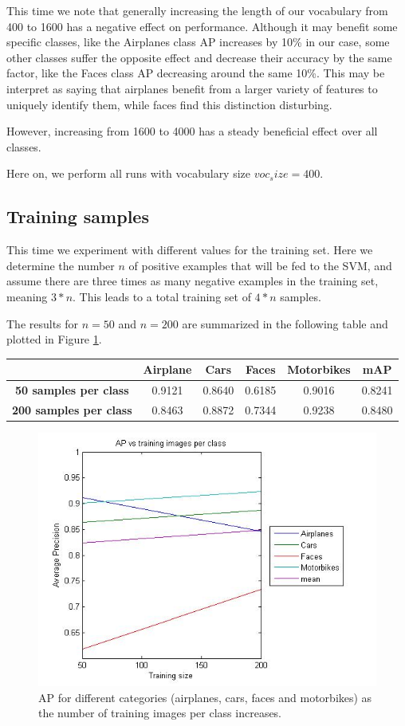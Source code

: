 \documentclass[11pt]{article}
\begin{document}
This time we note that generally increasing the length of our vocabulary from 400 to 1600 has a negative effect on performance. Although it may benefit some specific classes, like the Airplanes class AP increases by 10\% in our case, some other classes suffer the opposite effect and decrease their accuracy by the same factor, like the Faces class AP decreasing around the same 10\%. This may be interpret as saying that airplanes benefit from a larger variety of features to uniquely identify them, while faces find this distinction disturbing.

However, increasing from 1600 to 4000 has a steady beneficial effect over all classes.

Here on, we perform all runs with vocabulary size $voc_size = 400$.

\subsection{Training samples}
This time we experiment with different values for the training set. Here we determine the number $n$ of positive examples that will be fed to the SVM, and assume there are three times as many negative examples in the training set, meaning $3*n$. This leads to a total training set of $4*n$ samples. 

The results for $n = 50$ and $n=200$ are summarized in the following table and plotted in Figure \ref{fig:training_size_plot}.

\begin{center}
	\begin{tabular}{| c | c | c | c | c | c |}
		\hline
		\textbf{} & \textbf{Airplane} & \textbf{Cars} & \textbf{Faces} & \textbf{Motorbikes} & \textbf{mAP} \\ \hline
		\textbf{50 samples per class} & 0.9121 & 0.8640 & 0.6185 & 0.9016 & 0.8241 \\ \hline
		\textbf{200 samples per class} & 0.8463 & 0.8872 & 0.7344 & 0.9238 & 0.8480 \\ \hline
		\hline
	\end{tabular}
\end{center}

\begin{figure}[h]
	\centering
	\includegraphics[width=.8\textwidth]{img/training_size_plot.jpg}
	\caption{AP for different categories (airplanes, cars, faces and motorbikes) as the number of training images per class increases.}
	\label{fig:training_size_plot}
\end{figure}
\end{document}
